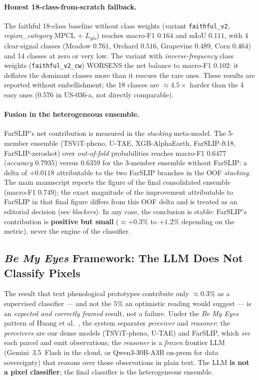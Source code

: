 \paragraph{Honest 18-class-from-scratch fallback.}
The faithful 18-class baseline without class weights (variant
\texttt{faithful\_v2}, \textit{region\_category} MPCL + $L_{glo}$) reaches
macro-F1 $0.164$ and mIoU $0.111$, with 4 clear-signal classes
(Meadow $0.761$, Orchard $0.516$, Grapevine $0.489$, Corn $0.464$) and 14 classes
at zero or very low. The variant with \textit{inverse-frequency} class weights
(\texttt{faithful\_v2\_cw}) WORSENS the net balance to macro-F1 $0.102$: it
deflates the dominant classes more than it rescues the rare ones. These results
are reported without embellishment; the 18 classes are $\approx4.5\times$ harder
than the 4 easy ones ($0.576$ in US-036-a, not directly comparable).

\paragraph{Fusion in the heterogeneous ensemble.}
FarSLIP's net contribution is measured in the \textit{stacking} meta-model. The
5-member ensemble (TSViT-pheno, U-TAE, XGB-AlphaEarth, FarSLIP-ft18,
FarSLIP-zeroshot) over \textit{out-of-fold} probabilities reaches macro-F1
$0.6477$ (\textit{accuracy} $0.7935$) versus $0.6359$ for the 3-member ensemble
without FarSLIP: a delta of $+0.0118$ attributable to the two FarSLIP branches in
the OOF \textit{stacking}. The main manuscript reports the figure of the final
consolidated ensemble (macro-F1 $0.749$); the exact magnitude of the improvement
attributable to FarSLIP in that final figure differs from this OOF delta and is
treated as an editorial decision (see \textit{blockers}). In any case, the
conclusion is stable: FarSLIP's contribution is \textbf{positive but small}
($\approx+0.3\%$ to $+1.2\%$ depending on the metric), never the engine of the
classifier.

\subsection{\textit{Be My Eyes} Framework: The LLM Does Not Classify Pixels}
\label{sec:farslip_bemyeyes}

The result that text phenological prototypes contribute only $\approx0.3\%$ as a
supervised classifier --- and not the $5\%$ an optimistic reading would suggest
--- is an \textit{expected and correctly framed} result, not a failure. Under the
\textit{Be My Eyes} pattern of Huang et al.~\cite{huang2025bemyeyes}, the system
separates \textit{perceiver} and \textit{reasoner}: the \textit{perceivers} are
our dense models (TSViT-pheno, U-TAE) and FarSLIP, which \textit{see} each parcel
and emit observations; the \textit{reasoner} is a \textit{frozen} frontier LLM
(Gemini~3.5~Flash in the cloud, or Qwen3-30B-A3B on-prem for data sovereignty)
that reasons over those observations in plain text. The LLM \textbf{is not a
pixel classifier}; the final classifier is the heterogeneous ensemble.

